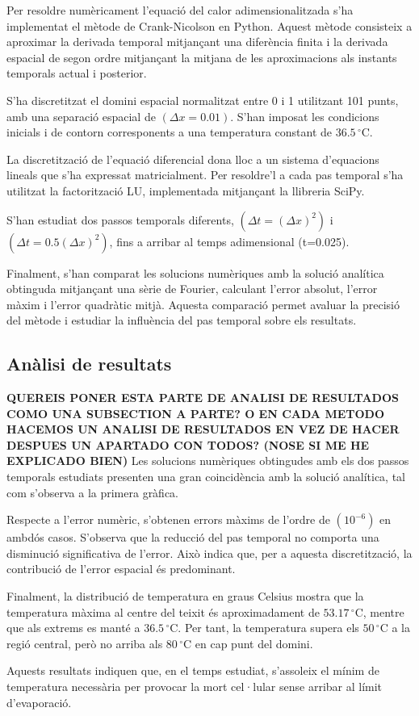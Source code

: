 \documentclass[a4paper,12pt,oneside]{article}
\begin{document}
Per resoldre numèricament l’equació del calor adimensionalitzada s’ha implementat el mètode de Crank-Nicolson en Python. Aquest mètode consisteix a aproximar la derivada temporal mitjançant una diferència finita i la derivada espacial de segon ordre mitjançant la mitjana de les aproximacions als instants temporals actual i posterior.

S’ha discretitzat el domini espacial normalitzat entre 0 i 1 utilitzant 101 punts, amb una separació espacial de $(\Delta x=0.01)$. S’han imposat les condicions inicials i de contorn corresponents a una temperatura constant de $36.5\,^\circ\mathrm{C} $.

La discretització de l’equació diferencial dona lloc a un sistema d’equacions lineals que s’ha expressat matricialment. Per resoldre’l a cada pas temporal s’ha utilitzat la factorització LU, implementada mitjançant la llibreria SciPy.

S’han estudiat dos passos temporals diferents, $(\Delta t=(\Delta x)^2)$ i $(\Delta t=0.5(\Delta x)^2)$, fins a arribar al temps adimensional (t=0.025).

Finalment, s’han comparat les solucions numèriques amb la solució analítica obtinguda mitjançant una sèrie de Fourier, calculant l’error absolut, l’error màxim i l’error quadràtic mitjà. Aquesta comparació permet avaluar la precisió del mètode i estudiar la influència del pas temporal sobre els resultats.

\subsection{Anàlisi de resultats}
\textbf{QUEREIS PONER ESTA PARTE DE ANALISI DE RESULTADOS COMO UNA SUBSECTION A PARTE? O EN CADA METODO HACEMOS UN ANALISI DE RESULTADOS EN VEZ DE HACER DESPUES UN APARTADO CON TODOS? (NOSE SI ME HE EXPLICADO BIEN)}
Les solucions numèriques obtingudes amb els dos passos temporals estudiats presenten una gran coincidència amb la solució analítica, tal com s’observa a la primera gràfica.

Respecte a l’error numèric, s’obtenen errors màxims de l’ordre de $(10^{-6})$ en ambdós casos. S’observa que la reducció del pas temporal no comporta una disminució significativa de l’error. Això indica que, per a aquesta discretització, la contribució de l’error espacial és predominant.

Finalment, la distribució de temperatura en graus Celsius mostra que la temperatura màxima al centre del teixit és aproximadament de $53.17\,^\circ\mathrm{C}$, mentre que als extrems es manté a $36.5\,^\circ\mathrm{C}$. Per tant, la temperatura supera els $50\,^\circ\mathrm{C}$ a la regió central, però no arriba als $80\,^\circ\mathrm{C}$ en cap punt del domini.

Aquests resultats indiquen que, en el temps estudiat, s’assoleix el mínim de temperatura necessària per provocar la mort cel·lular sense arribar al límit d’evaporació.
\end{document}
